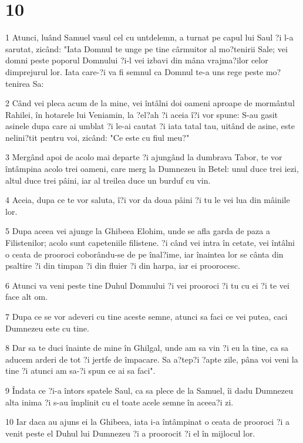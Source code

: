 \chapter{10}

\par 1 Atunci, luând Samuel vasul cel cu untdelemn, a turnat pe capul lui Saul ?i l-a sarutat, zicând: "Iata Domnul te unge pe tine cârmuitor al mo?tenirii Sale; vei domni peste poporul Domnului ?i-l vei izbavi din mâna vrajma?ilor celor dimprejurul lor. Iata care-?i va fi semnul ca Domnul te-a uns rege peste mo?tenirea Sa:
\par 2 Când vei pleca acum de la mine, vei întâlni doi oameni aproape de mormântul Rahilei, în hotarele lui Veniamin, la ?el?ah ?i aceia î?i vor spune: S-au gasit asinele dupa care ai umblat ?i le-ai cautat ?i iata tatal tau, uitând de asine, este nelini?tit pentru voi, zicând: "Ce este cu fiul meu?"
\par 3 Mergând apoi de acolo mai departe ?i ajungând la dumbrava Tabor, te vor întâmpina acolo trei oameni, care merg la Dumnezeu în Betel: unul duce trei iezi, altul duce trei pâini, iar al treilea duce un burduf cu vin.
\par 4 Aceia, dupa ce te vor saluta, î?i vor da doua pâini ?i tu le vei lua din mâinile lor.
\par 5 Dupa aceea vei ajunge la Ghibeea Elohim, unde se afla garda de paza a Filistenilor; acolo sunt capeteniile filistene. ?i când vei intra în cetate, vei întâlni o ceata de prooroci coborându-se de pe înal?ime, iar înaintea lor se cânta din psaltire ?i din timpan ?i din fluier ?i din harpa, iar ei proorocesc.
\par 6 Atunci va veni peste tine Duhul Domnului ?i vei prooroci ?i tu cu ei ?i te vei face alt om.
\par 7 Dupa ce se vor adeveri cu tine aceste semne, atunci sa faci ce vei putea, caci Dumnezeu este cu tine.
\par 8 Dar sa te duci înainte de mine în Ghilgal, unde am sa vin ?i eu la tine, ca sa aducem arderi de tot ?i jertfe de împacare. Sa a?tep?i ?apte zile, pâna voi veni la tine ?i atunci am sa-?i spun ce ai sa faci".
\par 9 Îndata ce ?i-a întors spatele Saul, ca sa plece de la Samuel, îi dadu Dumnezeu alta inima ?i s-au împlinit cu el toate acele semne în aceea?i zi.
\par 10 Iar daca au ajuns ei la Ghibeea, iata i-a întâmpinat o ceata de prooroci ?i a venit peste el Duhul lui Dumnezeu ?i a proorocit ?i el în mijlocul lor.
